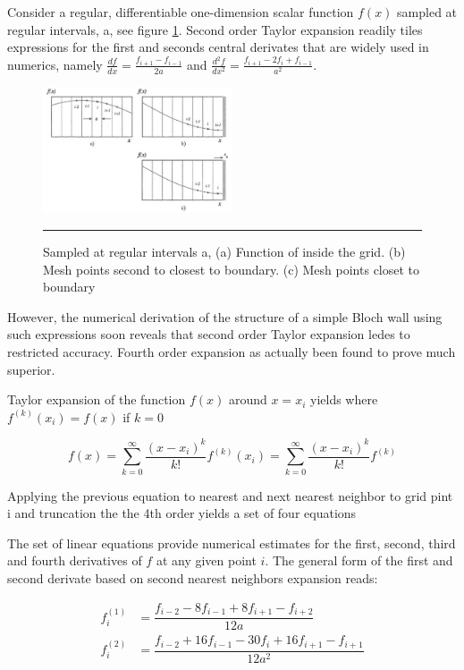 Consider a regular, differentiable one-dimension  scalar function $f(x)$ sampled at regular intervals, a, see figure  \ref{fig:bound}. Second order Taylor expansion readily tiles expressions for the first and seconds central derivates that are widely used in numerics, namely $\frac{df}{dx} = \frac{f_{i+1} - f_{i-1}}{2a}$ and $\frac{d^2f}{dx^2} = \frac{f_{i+1} - 2f_i + f_{i-1}}{a^2}$.

\begin{figure}[htbp]
	\centering
		\includegraphics[width=0.5\textwidth]{Figures/bound.png}
		\rule{35em}{0.2pt}
	\caption[Sampled at regular intervals a, Taylor expansion]{Sampled at regular intervals a, (a) Function of inside the grid. (b) Mesh points second to closest to boundary. (c) Mesh points closet to boundary}
	\label{fig:bound}
\end{figure}

However, the numerical derivation of the structure of a simple Bloch wall using such expressions soon reveals that second order Taylor expansion ledes to restricted accuracy. Fourth order expansion as actually been found to prove much superior.  \cite{methods}

Taylor expansion of the function $f(x)$ around $x=x_i$ yields where $f^{(k)}(x_i) = f(x)$ if $k=0$

$$f(x) = \sum\limits_{k=0}^{\infty} \dfrac{(x-x_i)^k}{k!}f^{(k)}(x_i) = \sum\limits_{k=0}^{\infty} \dfrac{(x-x_i)^k}{k!}f^{(k)}$$

Applying the previous equation to nearest and next nearest neighbor to grid pint i and truncation the the 4th order yields a set of four equations

The set of linear equations provide numerical estimates for the first, second, third and fourth derivatives of $f$ at any given point $i$. The general form of the first and second derivate based on second nearest neighbors expansion reads:

\begin{align} \label{eq:nn}
f^{(1)}_i &= \dfrac{f_{i-2}-8f_{i-1} + 8f_{i+1} - f_{i+2}}{12a} \\
f^{(2)}_i &= \dfrac{f_{i-2}+16f_{i-1} -30f_{i} + 16f_{i+1} - f_{i+1}}{12a^2}
\end{align}

